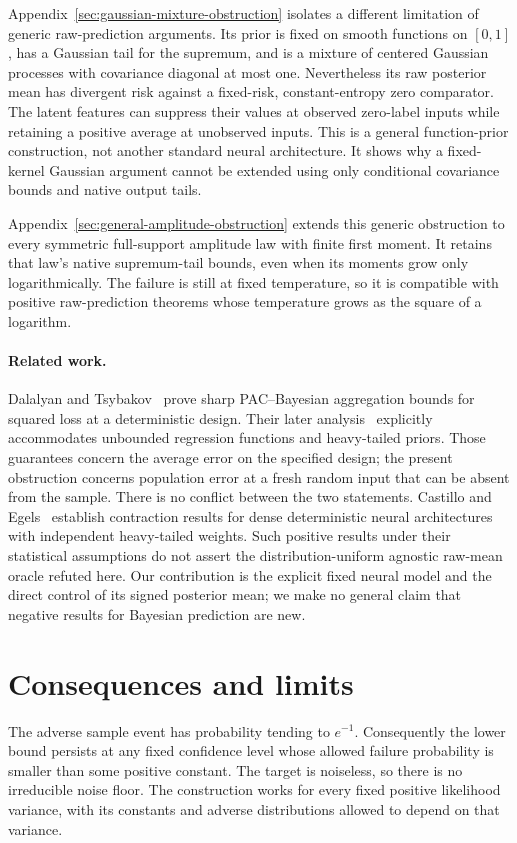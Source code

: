 \documentclass[11pt]{article}
\begin{document}
Appendix~\ref{sec:gaussian-mixture-obstruction} isolates a different
limitation of generic raw-prediction arguments. Its prior is fixed on
smooth functions on $[0,1]$, has a Gaussian tail for the supremum, and
is a mixture of centered Gaussian processes with covariance diagonal
at most one. Nevertheless its raw posterior mean has divergent risk
against a fixed-risk, constant-entropy zero comparator. The latent
features can suppress their values at observed zero-label inputs
while retaining a positive average at unobserved inputs. This is a
general function-prior construction, not another standard neural
architecture. It shows why a fixed-kernel Gaussian argument cannot
be extended using only conditional covariance bounds and native
output tails.

Appendix~\ref{sec:general-amplitude-obstruction} extends this generic
obstruction to every symmetric full-support amplitude law with finite
first moment. It retains that law's native supremum-tail bounds, even
when its moments grow only logarithmically. The failure is still at
fixed temperature, so it is compatible with positive raw-prediction
theorems whose temperature grows as the square of a logarithm.

\paragraph{Related work.}
Dalalyan and Tsybakov~\cite{dt} prove sharp PAC--Bayesian aggregation
bounds for squared loss at a deterministic design. Their later
analysis~\cite{dt-sparse} explicitly accommodates unbounded regression
functions and heavy-tailed priors. Those guarantees concern the
average error on the specified design; the present obstruction
concerns population error at a fresh random input that can be absent
from the sample. There is no conflict between the two statements.
Castillo and Egels~\cite{ce} establish contraction results for dense
deterministic neural architectures with independent heavy-tailed
weights. Such positive results under their statistical assumptions
do not assert the distribution-uniform agnostic raw-mean oracle
refuted here. Our contribution is the explicit fixed neural model
and the direct control of its signed posterior mean; we make no
general claim that negative results for Bayesian prediction are new.





\section{Consequences and limits}
The adverse sample event has probability tending to $e^{-1}$.
Consequently the lower bound persists at any fixed confidence level
whose allowed failure probability is smaller than some positive
constant. The target is noiseless, so there is no irreducible noise
floor. The construction works for every fixed positive likelihood
variance, with its constants and adverse distributions allowed to
depend on that variance.
\end{document}
